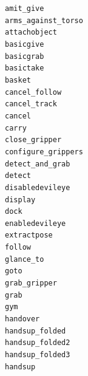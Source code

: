 \documentclass[compress]{beamer}
\begin{document}





{
\begin{frame}{}
    \begin{multicols}{4}
\scriptsize

{\tt amit\_give} \\
{\tt arms\_against\_torso} \\
{\tt attachobject} \\
{\tt basicgive} \\
{\tt basicgrab} \\
{\tt basictake} \\
{\tt basket} \\
{\tt cancel\_follow} \\
{\tt cancel\_track} \\
{\tt cancel} \\
{\tt carry} \\
{\tt close\_gripper} \\
{\tt configure\_grippers} \\
{\tt detect\_and\_grab} \\
{\tt detect} \\
{\tt disabledevileye} \\
{\tt display} \\
{\tt dock} \\
{\tt enabledevileye} \\
{\tt extractpose} \\
{\tt follow} \\
{\tt glance\_to} \\
{\tt goto} \\
{\tt grab\_gripper} \\
{\tt grab} \\
{\tt gym} \\
{\tt handover} \\
{\tt handsup\_folded} \\
{\tt handsup\_folded2} \\
{\tt handsup\_folded3} \\
{\tt handsup} \\

\end{multicols}
\end{frame}}
\end{document}

